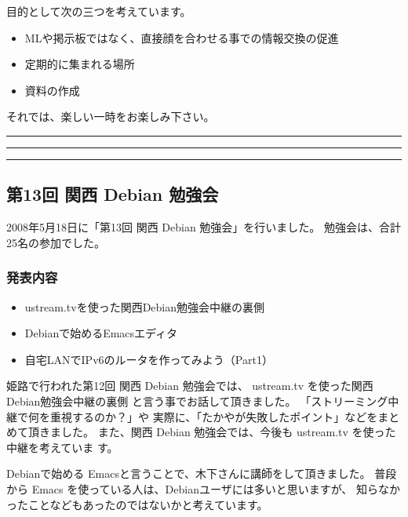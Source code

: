 \documentclass[mingoth,a4paper]{jsarticle}
\begin{document}
 目的として次の三つを考えています。
 \begin{itemize}
  \item MLや掲示板ではなく、直接顔を合わせる事での情報交換の促進
  \item 定期的に集まれる場所
  \item 資料の作成
 \end{itemize}

 それでは、楽しい一時をお楽しみ下さい。

\newpage

\begin{minipage}[b]{0.2\hsize}
 {}
\end{minipage}
\begin{minipage}[b]{0.8\hsize}
\hrule
\vspace{2mm}
\hrule
\setcounter{tocdepth}{1}
\tableofcontents
\vspace{2mm}
\hrule
\end{minipage}

\subsection{第13回 関西 Debian 勉強会}
2008年5月18日に「第13回 関西 Debian 勉強会」を行いました。
勉強会は、合計25名の参加でした。

\subsubsection{発表内容}

\begin{itemize}
 \item ustream.tvを使った関西Debian勉強会中継の裏側
 \item Debianで始めるEmacsエディタ
 \item 自宅LANでIPv6のルータを作ってみよう（Part1）
\end{itemize}

姫路で行われた第12回 関西 Debian 勉強会では、
ustream.tv を使った関西Debian勉強会中継の裏側
と言う事でお話して頂きました。
「ストリーミング中継で何を重視するのか？」や
実際に、「たかやが失敗したポイント」などをまとめて頂きました。
また、関西 Debian 勉強会では、今後も ustream.tv を使った中継を考えていま
す。

Debianで始める Emacsと言うことで、木下さんに講師をして頂きました。
普段から Emacs を使っている人は、Debianユーザには多いと思いますが、
知らなかったことなどもあったのではないかと考えています。
\end{document}

